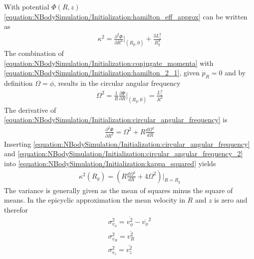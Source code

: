 \documentclass[letterpaper,10pt,english]{sphinxmanual}
\begin{document}
\sphinxAtStartPar
With potential \(\Phi\left(R,z\right)\) \eqref{equation:NBodySimulation/Initialization:hamilton_eff_approx} can be written as
\begin{equation}\label{equation:NBodySimulation/Initialization:kappa_squared}
\begin{split}\kappa^2 = \frac{\partial^2\Phi}{\partial R^2}\bigg|_{(R_g,0)} + \frac{3L_z^3}{R_g^4}\end{split}
\end{equation}
\sphinxAtStartPar
The combination of \eqref{equation:NBodySimulation/Initialization:conjugate_momenta} with \eqref{equation:NBodySimulation/Initialization:hamilton_2_1}, given \(\dot{p}_{R}=0\) and by definition \(\Omega = \dot{\phi}\), results in the circular angular frequency
\begin{equation}\label{equation:NBodySimulation/Initialization:circular_angular_frequency}
\begin{split}\Omega^2 = \frac{1}{R} \frac{\partial \Phi }{\partial R}\bigg|_{(R_g,0)} = \frac{L_z^2}{R^4}\end{split}
\end{equation}
\sphinxAtStartPar
The derivative of \eqref{equation:NBodySimulation/Initialization:circular_angular_frequency} is
\begin{equation}\label{equation:NBodySimulation/Initialization:circular_angular_frequency_2}
\begin{split}\frac{\partial^2\Phi}{\partial R^2} = \Omega^2 + R \frac{d\Omega^2}{dR}\end{split}
\end{equation}
\sphinxAtStartPar
Inserting \eqref{equation:NBodySimulation/Initialization:circular_angular_frequency} and \eqref{equation:NBodySimulation/Initialization:circular_angular_frequency_2} into \eqref{equation:NBodySimulation/Initialization:kappa_squared} yields
\begin{equation}\label{equation:NBodySimulation/Initialization:epicyclic_frequency}
\begin{split}\kappa^2(R_g) = \left ( R\frac{d\Omega^2}{dR} + 4\Omega^2 \right )\bigg|_{R=R_g}\end{split}
\end{equation}
\sphinxAtStartPar
The variance is generally given as the mean of squares minus the square of means.
In the epicyclic approximation the mean velocity in \(R\) and \(z\) is zero and therefor
\begin{equation}\label{equation:NBodySimulation/Initialization:epicyclic_variance}
\begin{split}\sigma_{v_{\phi}}^2 = \overline{v_\phi^2} - \overline{v_\phi}^2 \\
\sigma_{v_{R}}^2 = \overline{v_R^2} \\
\sigma_{v_{z}}^2 = \overline{v_z^2}\end{split}
\end{equation}
\end{document}
